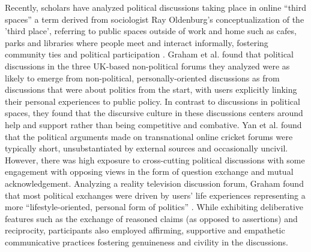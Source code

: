 \documentclass[letterpaper]{article} %
\begin{document}
Recently, scholars have analyzed political discussions taking place in online ``third spaces'' a term derived from sociologist Ray Oldenburg's conceptualization of the 'third place', referring to public spaces outside of work and home such as cafes, parks and libraries where people meet and interact informally, fostering community ties and political participation \cite{wright2012third,oldenburg2001celebrating}. Graham et al. \citeyearpar{graham2015everyday} found that political discussions in the three UK-based non-political forums they analyzed were as likely to emerge from non-political, personally-oriented discussions as from discussions that were about politics from the start, with users explicitly linking their personal experiences to public policy. In contrast to discussions in political spaces, they found that the discursive culture in these discussions centers around help and support rather than being competitive and combative.
Yan et al. \citeyearpar{yan2018s} found that the political arguments made on transnational online cricket forums were typically short, unsubstantiated by external sources and occasionally uncivil. However, there was high exposure to cross-cutting political discussions with some engagement with opposing views in the form of question exchange and mutual acknowledgement. Analyzing a  reality television discussion forum, Graham found that most political exchanges were driven by users' life experiences representing a more ``lifestyle-oriented, personal form of politics'' \cite{graham2012beyond}. While exhibiting deliberative features such as the exchange of reasoned claims (as opposed to assertions) and reciprocity, participants also employed affirming, supportive and empathetic communicative practices fostering genuineness and civility in the discussions.
\end{document}
